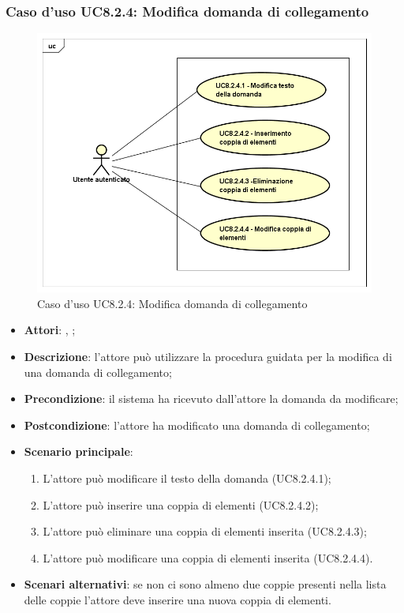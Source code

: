 \subsubsection{Caso d'uso UC8.2.4: Modifica domanda di collegamento}
\label{UC8.2.4}
\begin{figure}[h]
	\centering
	\includegraphics[scale=0.5,keepaspectratio]{UML/UC8_2_4.png}
	\caption{Caso d'uso UC8.2.4: Modifica domanda di collegamento}
\end{figure}
\FloatBarrier
\begin{itemize}
	\item \textbf{Attori}: \uau, \uaupro;
	\item \textbf{Descrizione}: l'attore può utilizzare la procedura guidata per la modifica di una domanda di collegamento; 
	\item \textbf{Precondizione}: il sistema ha ricevuto dall'attore la domanda da modificare; 
	\item \textbf{Postcondizione}: l'attore ha modificato una domanda di collegamento;
	\item \textbf{Scenario principale}: 
	\begin{enumerate}
			\item L'attore può modificare il testo della domanda (UC8.2.4.1);
			\item L'attore può inserire una coppia di elementi (UC8.2.4.2);
			\item L'attore può eliminare una coppia di elementi inserita (UC8.2.4.3);
			\item L'attore può modificare una coppia di elementi inserita (UC8.2.4.4).
		\end{enumerate}
	\item \textbf{Scenari alternativi}: se non ci sono almeno due coppie presenti nella lista delle coppie l'attore deve inserire una nuova coppia di elementi.
\end{itemize}

